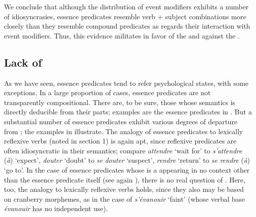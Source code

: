 \documentclass[output=paper]{langsci/langscibook}
\begin{document}
We conclude that although the distribution of event modifiers exhibits a number of idiosyncrasies, essence predicates resemble verb + subject combinations more closely than they resemble compound predicates as regards their interaction with event modifiers.  Thus, this evidence militates in favor of the  and against the .

\subsection{Lack of }

As we have seen, essence predicates tend to refer psychological states, with some exceptions.  In a large proportion of cases, essence predicates are not transparently compositional. There are, to be sure, those whose semantics is directly deducible from their parts; examples are the essence predicates in . But a substantial number of essence predicates exhibit various degrees of departure from ; the examples in  illustrate. The analogy of essence predicates to lexically reflexive verbs (noted 
in section 1) is again apt, since reflexive predicates are often idiosyncratic in their semantics; compare \emph{attendre} `wait for' to \textit{s'attendre} (\textit{\`a}) `expect', \emph{douter} `doubt' to \emph{se} \emph{douter} `suspect', \emph{rendre} `return' to \emph{se} \emph{rendre} (\textit{\`a}) `go to'.  In the case of essence predicates whose  is a  appearing in no context other than the essence predicate itself (see again ), there is no real question of . Here, too, the analogy to lexically reflexive verbs holds, since they also may be based on cranberry morphemes, as in the case of  \textit{s'\'evanouir} `faint' (whose verbal base \textit{\'evanouir} has no independent use).
\end{document}
